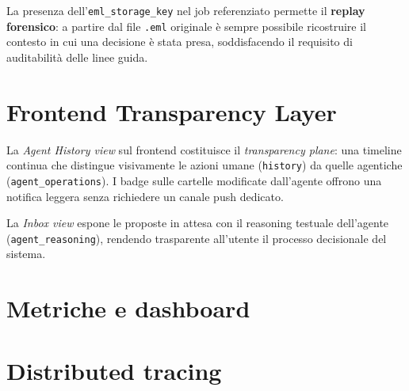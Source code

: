 La presenza dell'\texttt{eml\_storage\_key} nel job referenziato permette il
\textbf{replay forensico}: a partire dal file \texttt{.eml} originale \`e sempre
possibile ricostruire il contesto in cui una decisione \`e stata presa, soddisfacendo
il requisito di auditabilit\`a delle linee guida.

\section{Frontend Transparency Layer}
\label{sec:transparency}

La \emph{Agent History view} sul frontend costituisce il \emph{transparency plane}: una
timeline continua che distingue visivamente le azioni umane (\texttt{history}) da quelle
agentiche (\texttt{agent\_operations}). I badge sulle cartelle modificate dall'agente
offrono una notifica leggera senza richiedere un canale push dedicato.

La \emph{Inbox view} espone le proposte in attesa con il reasoning testuale dell'agente
(\texttt{agent\_reasoning}), rendendo trasparente all'utente il processo decisionale
del sistema.

\section{Metriche e dashboard}
\label{sec:metrics}


\section{Distributed tracing}
\label{sec:tracing}


